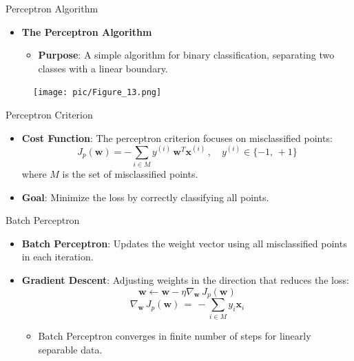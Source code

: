 \documentclass[serif, aspectratio=169]{beamer}
\begin{document}
    \begin{frame}{Perceptron Algorithm}
        \begin{itemize}
            \item \textbf{The Perceptron Algorithm}
            \medskip
            \begin{itemize}\itemsep1em
            \item \justifying \textbf{Purpose}:
            A simple algorithm for binary classification, separating two classes with a linear boundary.
            \end{itemize}
        \end{itemize}
        \begin{figure}
            \centering
            \texttt{[image: pic/Figure\_13.png]}
        \end{figure}
        \vfill
    \end{frame}


    \begin{frame}{Perceptron Criterion}
        \begin{itemize}\itemsep1.2em
        \item \textbf{Cost Function}:
        The perceptron criterion focuses on misclassified points:
        \[
            J_p(\mathbf{w}) = - \sum_{i \in M} y^{(i)} \, \mathbf{w}^T \mathbf{x}^{(i)} \, , \quad y^{(i)} \in \{-1, \, +1\}
        \]
        where \( M \) is the set of misclassified points.
        \item \textbf{Goal}:
        Minimize the loss by correctly classifying all points.
        \end{itemize}
    \end{frame}


    \begin{frame}{Batch Perceptron}
        \begin{itemize}\itemsep1.5em
        \item \justifying \textbf{Batch Perceptron}:
        Updates the weight vector using all misclassified points in each iteration.
        \item \justifying \textbf{Gradient Descent}:
        Adjusting weights in the direction that reduces the loss:
        \[
            \mathbf{w} \leftarrow \mathbf{w} - \eta \nabla_\mathbf{w} \, J_p(\mathbf{w})
        \]
        \[
            \nabla_\mathbf{w} \, J_p(\mathbf{w}) \, = \, - \sum_{i \in M} y_i \mathbf{x}_i
        \]
        \begin{itemize}
            \item Batch Perceptron converges in finite number of steps for linearly separable data.
        \end{itemize}
        \end{itemize}
    \end{frame}
\end{document}
